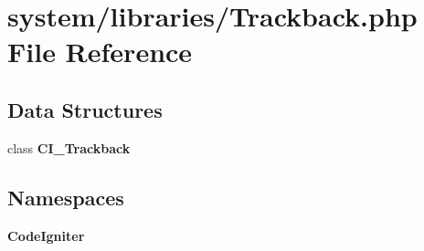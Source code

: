 \section{system/libraries/\-Trackback.php File Reference}
\label{_trackback_8php}
\subsection*{Data Structures}
\begin{DoxyCompactItemize}
\item 
class {\bf C\-I\-\_\-\-Trackback}
\end{DoxyCompactItemize}
\subsection*{Namespaces}
\begin{DoxyCompactItemize}
\item 
{\bf Code\-Igniter}
\end{DoxyCompactItemize}
